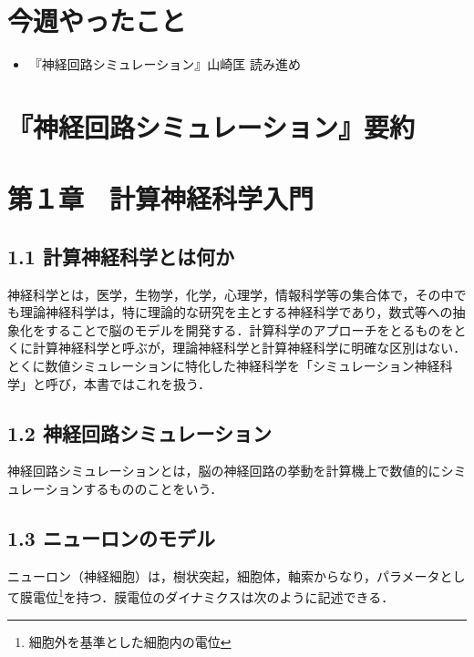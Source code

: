 \documentclass[dvipdfmx, A4j, twocolumn, 10.5pt]{jsarticle}
\begin{document}


\section{今週やったこと}
\begin{itemize}
 \item 『神経回路シミュレーション』山崎匡 読み進め

\end{itemize}
\section{『神経回路シミュレーション』要約}

\section*{第１章　計算神経科学入門}
\subsection*{1.1 計算神経科学とは何か}
神経科学とは，医学，生物学，化学，心理学，情報科学等の集合体で，その中でも理論神経科学は，特に理論的な研究を主とする神経科学であり，数式等への抽象化をすることで脳のモデルを開発する．計算科学のアプローチをとるものをとくに計算神経科学と呼ぶが，理論神経科学と計算神経科学に明確な区別はない．とくに数値シミュレーションに特化した神経科学を「シミュレーション神経科学」と呼び，本書ではこれを扱う．

\subsection*{1.2 神経回路シミュレーション}
神経回路シミュレーションとは，脳の神経回路の挙動を計算機上で数値的にシミュレーションするもののことをいう．

\subsection*{1.3 ニューロンのモデル}
ニューロン（神経細胞）は，樹状突起，細胞体，軸索からなり，パラメータとして膜電位\footnote{細胞外を基準とした細胞内の電位}を持つ．膜電位のダイナミクスは次のように記述できる．
\end{document}
